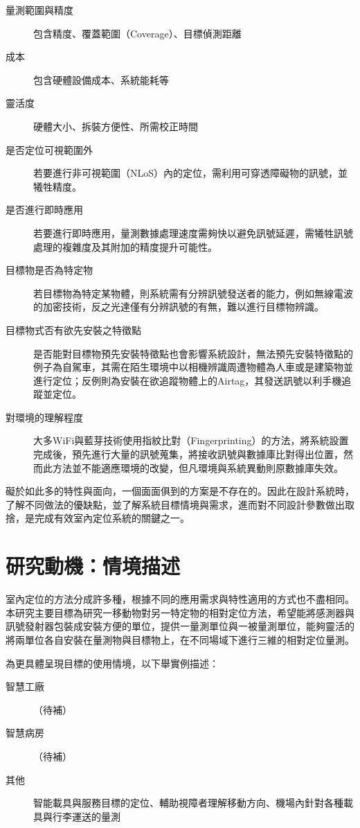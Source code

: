 \begin{description}
    \item[量測範圍與精度] 
    包含精度、覆蓋範圍（Coverage）、目標偵測距離
    \item[成本] 
    包含硬體設備成本、系統能耗等
    \item[靈活度] 
    硬體大小、拆裝方便性、所需校正時間
    \item[是否定位可視範圍外] 
    若要進行非可視範圍（NLoS）內的定位，需利用可穿透障礙物的訊號，並犧牲精度。
    \item[是否進行即時應用] 
    若要進行即時應用，量測數據處理速度需夠快以避免訊號延遲，需犧牲訊號處理的複雜度及其附加的精度提升可能性。
    \item[目標物是否為特定物] 
    若目標物為特定某物體，則系統需有分辨訊號發送者的能力，例如無線電波的加密技術，反之光達僅有分辨訊號的有無，難以進行目標物辨識。
    \item[目標物式否有欲先安裝之特徵點] 
    是否能對目標物預先安裝特徵點也會影響系統設計，無法預先安裝特徵點的例子為自駕車，其需在陌生環境中以相機辨識周遭物體為人車或是建築物並進行定位；反例則為安裝在欲追蹤物體上的Airtag，其發送訊號以利手機追蹤並定位。 
    \item[對環境的理解程度]    
    大多WiFi與藍芽技術使用指紋比對（Fingerprinting）的方法，將系統設置完成後，預先進行大量的訊號蒐集，將接收訊號與數據庫比對得出位置，然而此方法並不能適應環境的改變，但凡環境與系統異動則原數據庫失效。  
\end{description}


礙於如此多的特性與面向，一個面面俱到的方案是不存在的。因此在設計系統時，了解不同做法的優缺點，並了解系統目標情境與需求，進而對不同設計參數做出取捨，是完成有效室內定位系統的關鍵之一\cite{survey_indoor2018}。





\section{研究動機：情境描述}
室內定位的方法分成許多種，根據不同的應用需求與特性適用的方式也不盡相同。本研究主要目標為研究一移動物對另一特定物的相對定位方法，希望能將感測器與訊號發射器包裝成安裝方便的單位，提供一量測單位與一被量測單位，能夠靈活的將兩單位各自安裝在量測物與目標物上，在不同場域下進行三維的相對定位量測。

為更具體呈現目標的使用情境，以下舉實例描述：
\begin{description}
    \item[智慧工廠] （待補）
    \item[智慧病房] （待補）
    \item[其他]  
    智能載具與服務目標的定位、輔助視障者理解移動方向、機場內針對各種載具與行李運送的量測
\end{description}

